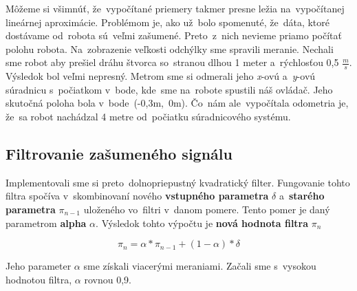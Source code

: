 Môžeme si všimnúť, že~vypočítané priemery takmer presne ležia na~vypočítanej lineárnej aproximácie. Problémom je, ako už~bolo spomenuté, že~dáta,
ktoré dostávame od~robota sú~veľmi zašumené. Preto~z~nich nevieme priamo počítať polohu robota. Na~zobrazenie veľkosti odchýlky sme spravili
meranie. Nechali sme robot aby prešiel dráhu štvorca so~stranou dlhou 1 meter a~rýchlosťou 0,5 \(\frac{m}{s}\). Výsledok bol veľmi nepresný.
Metrom sme si odmerali jeho \textit{x}-ovú a~\textit{y}-ovú súradnicu s~počiatkom v~bode, kde~sme na~robote spustili náš ovládač. Jeho skutočná
poloha bola v~bode~(-0,3m,~0m). Čo~nám ale~vypočítala odometria je, že~sa robot nachádzal 4 metre od~počiatku súradnicového systému.

\subsection{Filtrovanie zašumeného signálu}

Implementovali sme si preto~dolnopriepustný kvadratický filter. Fungovanie tohto filtra spočíva v~skombinovaní nového
\textbf{vstupného parametra} $\delta$ a~\textbf{starého parametra} $\pi_{n-1}$ uloženého vo~filtri v~danom pomere. Tento pomer je daný
parametrom \textbf{alpha} $\alpha$. Výsledok tohto výpočtu je \textbf{nová hodnota filtra} $\pi_n$

\begin{equation}
	\pi_n = \alpha * \pi_{n-1} + (1 - \alpha) * \delta
	\label{eq:stateOfFilter}
\end{equation}

Jeho parameter $\alpha$ sme získali viacerými meraniami. Začali sme s~vysokou hodnotou filtra, $\alpha$ rovnou  0,9.

